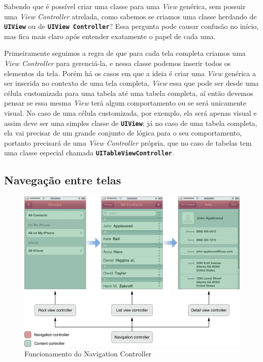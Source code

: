 \documentclass[a4paper,12pt,brazil,oneside]{book}
\begin{document}
Sabendo que é possível criar uma classe para uma \emph{View} genérica, sem possuir uma \emph{View Controller} atrelada, como sabemos se criamos uma classe herdando de \texttt{\textbf{UIView}} ou de \texttt{\textbf{UIView Controller}}? Essa pergunta pode causar confusão no início, mas fica mais claro após entender exatamente o papel de cada uma.

Primeiramente seguimos a regra de que para cada tela completa criamos uma \emph{View Controller} para gerenciá-la, e nessa classe podemos inserir todos os elementos da tela. Porém há os casos em que a ideia é criar uma \emph{View} genérica a ser inserida no contexto de uma tela completa, \emph{View} essa que pode ser desde uma célula customizada para uma tabela até uma tabela completa, aí então devemos pensar se essa mesma \emph{View} terá algum comportamento ou se será unicamente visual. No caso de uma célula customizada, por exemplo, ela será apenas visual e assim deve ser uma simples classe de \texttt{\textbf{UIView}}; já no caso de uma tabela completa, ela vai precisar de um grande conjunto de lógica para o seu comportamento, portanto precisará de uma \emph{View Controller} própria, que no caso de tabelas tem uma classe especial chamada \texttt{\textbf{UITableViewController}}.

\subsection{Navegação entre telas}

\begin{figure}[h]
  \centering
  \includegraphics[width=\textwidth]{figuras/apple_navigation_interface.png}
  \caption{Funcionamento do Navigation Controller}
  \label{fig:a}
\end{figure}
\end{document}
